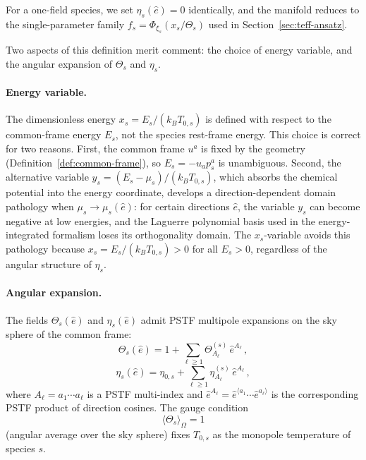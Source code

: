 For a one-field species, we set $\eta_s(\hat{e}) = 0$
identically, and the manifold reduces to the
single-parameter family
$f_s = \Phi_{\xi_s}(x_s/\Theta_s)$ used in
Section~\ref{sec:teff-ansatz}.

Two aspects of this definition merit comment: the choice
of energy variable, and the angular expansion of
$\Theta_s$ and $\eta_s$.


\paragraph{Energy variable.}

The dimensionless energy $x_s = E_s/(k_B T_{0,s})$ is
defined with respect to the common-frame energy $E_s$,
not the species rest-frame energy.  This choice is correct
for two reasons.  First, the common frame $u^a$ is
fixed by the geometry (Definition~\ref{def:common-frame}),
so $E_s = -u_a p_s^a$ is unambiguous.  Second, the
alternative variable
$y_s = (E_s - \mu_s)/(k_B T_{0,s})$, which absorbs the
chemical potential into the energy coordinate, develops a
direction-dependent domain pathology when
$\mu_s \to \mu_s(\hat{e})$: for certain directions
$\hat{e}$, the variable $y_s$ can become negative at low
energies, and the Laguerre polynomial basis used in the
energy-integrated formalism loses its orthogonality
domain.  The $x_s$-variable avoids this pathology because
$x_s = E_s/(k_B T_{0,s}) > 0$ for all $E_s > 0$,
regardless of the angular structure of $\eta_s$.


\paragraph{Angular expansion.}

The fields $\Theta_s(\hat{e})$ and $\eta_s(\hat{e})$
admit PSTF multipole expansions on the sky sphere of the
common frame:
\begin{equation}\label{eq:Theta-s-PSTF}
\Theta_s(\hat{e})
= 1 + \sum_{\ell \geq 1}
  \Theta^{(s)}_{A_\ell}\,
  \hat{e}^{A_\ell}\,,
\end{equation}
\begin{equation}\label{eq:eta-s-PSTF}
\eta_s(\hat{e})
= \eta_{0,s}
+ \sum_{\ell \geq 1}
  \eta^{(s)}_{A_\ell}\,
  \hat{e}^{A_\ell}\,,
\end{equation}
where $A_\ell = a_1 \cdots a_\ell$ is a PSTF multi-index
and $\hat{e}^{A_\ell}
= \hat{e}^{\langle a_1} \cdots \hat{e}^{a_\ell \rangle}$
is the corresponding PSTF product of direction cosines.
The gauge condition
\begin{equation}\label{eq:Theta-s-gauge}
\langle \Theta_s \rangle_\Omega = 1
\end{equation}
(angular average over the sky sphere) fixes $T_{0,s}$ as
the monopole temperature of species $s$.

